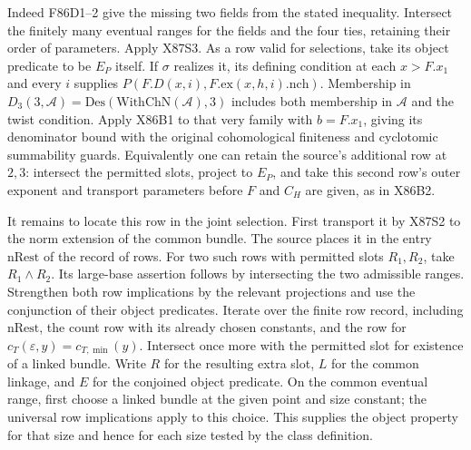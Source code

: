 Indeed F86D1--2 give the missing two fields from the stated
inequality. Intersect the finitely many eventual ranges for the
fields and the four ties, retaining their order of parameters.
Apply X87S3. As a row valid for selections, take its object
predicate to be $E_P$ itself. If $\sigma$ realizes it, its defining
condition at each $x>F.x_1$ and every $i$ supplies
$P(F.D(x,i),F.\mathrm{ex}(x,h,i).\mathrm{nch})$.
Membership in $D_3(3,\mathcal A)=\mathrm{Des}(\mathrm{WithChN}(\mathcal A),3)$
includes both membership in $\mathcal A$ and the twist condition.
Apply X86B1 to that very family with $b=F.x_1$, giving its
denominator bound with the original cohomological finiteness and
cyclotomic summability guards. Equivalently one can retain the
source's additional row at $2,3$: intersect the permitted slots,
project to $E_P$, and take this second row's outer exponent and
transport parameters before $F$ and $C_H$ are given, as in X86B2.

It remains to locate this row in the joint selection. First transport
it by X87S2 to the norm extension of the common bundle. The source
places it in the entry $\mathrm{nRest}$ of the record of rows.
For two such rows with permitted slots $R_1,R_2$, take
$R_1\wedge R_2$. Its large-base assertion follows by intersecting
the two admissible ranges. Strengthen both row implications by
the relevant projections and use the conjunction of their
object predicates. Iterate over the finite row record, including
$\mathrm{nRest}$, the count row with its already chosen constants,
and the row for $c_T(\varepsilon,y)=c_{T,\min}(y)$. Intersect once
more with the permitted slot for existence of a linked bundle.
Write $R$ for the resulting extra slot, $L$ for the common linkage,
and $E$ for the conjoined object predicate. On the common eventual
range, first choose a linked bundle at the given point and size
constant; the universal row implications apply to this choice.
This supplies the object property for that size and hence for each
size tested by the class definition.

